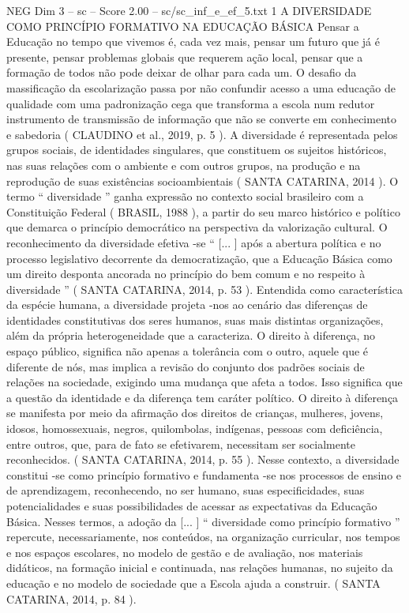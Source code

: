 \begin{textsample}{NEG Dim 3 – sc – Score 2.00 – sc/sc\_inf\_e\_ef\_5.txt}  \label{ex:f3_neg_224}
1 A DIVERSIDADE COMO PRINCÍPIO FORMATIVO NA EDUCAÇÃO BÁSICA Pensar a Educação no tempo que vivemos é, cada vez mais, pensar um futuro que já é presente, pensar problemas globais que requerem ação local, pensar que a formação de todos não pode deixar de olhar para cada um.
O desafio da massificação da escolarização passa por não confundir acesso a uma educação de qualidade com uma padronização cega que transforma a escola num redutor instrumento de transmissão de informação que não se converte em conhecimento e sabedoria ( CLAUDINO et al., 2019, p. 5 ).
A diversidade é representada pelos grupos sociais, de identidades singulares, que constituem os sujeitos históricos, nas suas relações com o ambiente e com outros grupos, na produção e na reprodução de suas existências socioambientais ( SANTA CATARINA, 2014 ).
O termo “ diversidade ” ganha expressão no contexto social brasileiro com a Constituição Federal ( BRASIL, 1988 ), a partir do seu marco histórico e político que demarca o princípio democrático na perspectiva da valorização cultural.
O reconhecimento da diversidade efetiva -se “ [... ] após a abertura política e no processo legislativo decorrente da democratização, que a Educação Básica como um direito desponta ancorada no princípio do bem comum e no respeito à diversidade ” ( SANTA CATARINA, 2014, p. 53 ).
Entendida como característica da espécie humana, a diversidade projeta -nos ao cenário das diferenças de identidades constitutivas dos seres humanos, suas mais distintas organizações, além da própria heterogeneidade que a caracteriza.
O direito à diferença, no espaço público, significa não apenas a tolerância com o outro, aquele que é diferente de nós, mas implica a revisão do conjunto dos padrões sociais de relações na sociedade, exigindo uma mudança que afeta a todos.
Isso significa que a questão da identidade e da diferença tem caráter político.
O direito à diferença se manifesta por meio da afirmação dos direitos de crianças, mulheres, jovens, idosos, homossexuais, negros, quilombolas, indígenas, pessoas com deficiência, entre outros, que, para de fato se efetivarem, necessitam ser socialmente reconhecidos. ( SANTA CATARINA, 2014, p. 55 ).
Nesse contexto, a diversidade constitui -se como princípio formativo e fundamenta -se nos processos de ensino e de aprendizagem, reconhecendo, no ser humano, suas especificidades, suas potencialidades e suas possibilidades de acessar as expectativas da Educação Básica.
Nesses termos, a adoção da [... ] “ diversidade como princípio formativo ” repercute, necessariamente, nos conteúdos, na organização curricular, nos tempos e nos espaços escolares, no modelo de gestão e de avaliação, nos materiais didáticos, na formação inicial e continuada, nas relações humanas, no sujeito da educação e no modelo de sociedade que a Escola ajuda a construir. ( SANTA CATARINA, 2014, p. 84 ).

\end{textsample}
